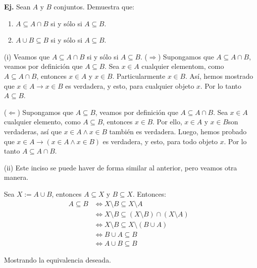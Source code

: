 \documentclass[letterpaper,DIV=14,headsepline,12pt]{scrartcl}
\makeatletter
\newcounter{Ejer}
\newcommand{\pts}{}
\newenvironment{ejercicio}[1]{\noindent
    \ifthenelse{\equal{#1}{1} \OR \equal{#1}{+1}}{\renewcommand{\pts}{\textbf{(#1 pt)}}}{\renewcommand{\pts}{\textbf{(#1 pts)}}}\textbf{Ej. \theEjer} \pts\stepcounter{Ejer}}{\vspace{.3cm}}
\renewenvironment{proof}[1][]{%
        \par\pushQED{\qed}%
        \normalfont\topsep6pt \partopsep0pt %
        \trivlist
        \item[\hskip\labelsep
                \textbf{\textit{Demostración.}}%
        ]#1
        }{%
        \popQED\endtrivlist\@endpefalse
    }
\makeatother
\begin{document}
    \begin{ejercicio}{1}
        Sean $A$ y $B$ conjuntos. Demuestra que:
        \begin{enumerate}
            \item $A \subseteq A \cap B$ si y sólo si $A \subseteq B$.
            \item $A \cup B \subseteq B$ si y sólo si $A \subseteq B$.
        \end{enumerate}
    \end{ejercicio}
    \begin{proof}
        (i) Veamos que $A \subseteq A \cap B$ si y sólo si $A \subseteq B$.
        ($\Rightarrow$) Supongamos que $A \subseteq A \cap B$, veamos por definición que $A \subseteq B$. Sea $x \in A$ cualquier elementom, como $A \subseteq A \cap B$, entonces $x \in A$ y $x \in B$. Particularmente $x \in B$. Así, hemos mostrado que $x\in A \to x \in B$ es verdadera, y esto, para cualquier objeto $x$. Por lo tanto $A \subseteq B$.

        ($\Leftarrow$) Supongamos que $A \subseteq B$, veamos por definición que $A \subseteq A \cap B$. Sea $x \in A$ cualquier elemento, como $A \subseteq B$, entonces $x \in B$. Por ello, $x \in A$ y $x \in B $son verdaderas, así que $x \in A \land x \in B$ también es verdadera. Luego, hemos probado que $x \in A \to (x \in A \land x \in B)$ es verdadera, y esto, para todo objeto $x$. Por lo tanto $A \subseteq A \cap B$.

        (ii) Este inciso se puede haver de forma similar al anterior, pero veamos otra manera.

        Sea $X:=A\cup B$, entonces $A  \subseteq X$ y $B \subseteq X$. Entonces:
        \begin{align*}
            A \subseteq B & \Leftrightarrow X \setminus B \subseteq X \setminus A \tag*{Probado en calse} \\
            & \Leftrightarrow X \setminus B \subseteq (X \setminus B) \cap (X \setminus A) \tag*{Inciso anterior} \\
            & \Leftrightarrow X \setminus B \subseteq X \setminus (B \cup A) \tag*{Probado en clase} \\
            & \Leftrightarrow B \cup A \subseteq B \tag*{Probado en clase} \\
            & \Leftrightarrow A \cup B \subseteq B \tag*{Probado en clase}
        \end{align*}
        
        Mostrando la equivalencia deseada.
    \end{proof}
\end{document}
